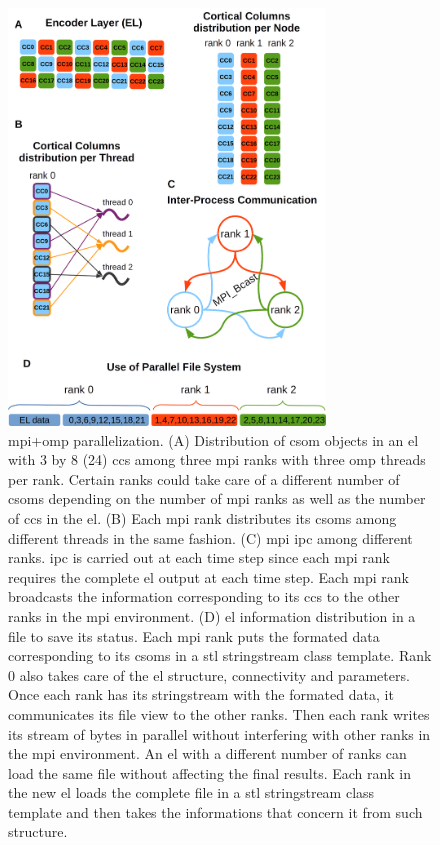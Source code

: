 \documentclass[10pt,letterpaper]{article}
\begin{document}
\begin{figure}[h!]
    \centering
    \includegraphics[width=0.75\textwidth]{EncoderParallelization.png}
    \caption{ \gls{mpi}+\gls{omp} parallelization. (A) Distribution of \gls{csom} objects in an \gls{el} with
    3 by 8 (24) \glspl{cc} among three \gls{mpi} ranks with three \gls{omp} threads per rank.
    Certain ranks could take care of a different number of
    \glspl{csom} depending on the number of \gls{mpi} ranks as well as the number of \glspl{cc} in the \gls{el}.
    (B) Each \gls{mpi} rank distributes its \glspl{csom} among different threads in the same fashion.
    (C) \gls{mpi} \gls{ipc} among different ranks. \gls{ipc} is carried out at each time step since each \gls{mpi} rank 
    requires the complete \gls{el} output at each time step.
    Each \gls{mpi} rank broadcasts the information corresponding to its \glspl{cc} to the other ranks in the \gls{mpi}
    environment.
    (D) \gls{el} information distribution in a file to save its status.
    Each \gls{mpi} rank puts the formated data corresponding to its \glspl{csom} in a \gls{stl} stringstream class template.
    Rank 0 also takes care of the \gls{el} structure, connectivity and parameters.
    Once each rank has its stringstream with the formated data, it communicates its file view to the other ranks.
    Then each rank writes its stream of bytes in parallel without interfering with other ranks in the \gls{mpi} environment.
    An \gls{el} with a different number of ranks can load the same file without affecting the final results.
    Each rank in the new \gls{el} loads the complete file in a \gls{stl} stringstream class template and then takes the
    informations that concern it from such structure.}
    \label{fig:EncoderParallelization}
\end{figure}
\end{document}
